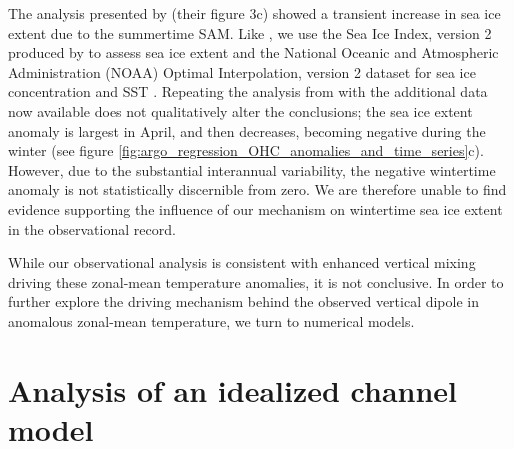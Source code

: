 \documentclass{ametsocV5}
\begin{document}
The analysis presented by \citet{Doddridge2017} (their figure 3c) showed a transient increase in sea ice extent due to the summertime SAM. Like \citet{Doddridge2017}, we use the Sea Ice Index, version 2 produced by \citet{Fetterer2016} to assess sea ice extent and the National Oceanic and Atmospheric Administration (NOAA) Optimal Interpolation, version 2 dataset for sea ice concentration and SST \citep{Reynolds2002}. Repeating the analysis from \citet{Doddridge2017} with the additional data now available does not qualitatively alter the conclusions; the sea ice extent anomaly is largest in April, and then decreases, becoming negative during the winter (see figure \ref{fig:argo_regression_OHC_anomalies_and_time_series}c). However, due to the substantial interannual variability, the negative wintertime anomaly is not statistically discernible from zero. We are therefore unable to find evidence supporting the influence of our mechanism on wintertime sea ice extent in the observational record.

While our observational analysis is consistent with enhanced vertical mixing driving these zonal-mean temperature anomalies, it is not conclusive. In order to further explore the driving mechanism behind the observed vertical dipole in anomalous zonal-mean temperature, we turn to numerical models.




\section{Analysis of an idealized channel model} %
\label{sec:analysis_of_an_idealised_channel_model}
\end{document}
